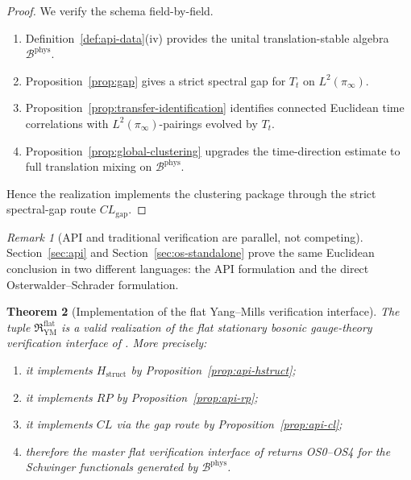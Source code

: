 \documentclass[11pt]{article}
\newtheorem{theorem}{Theorem}[section]
\theoremstyle{definition}
\theoremstyle{remark}
\newtheorem{remark}[theorem]{Remark}
\newcommand{\mcB}{\mathcal B}
\begin{document}
\begin{proof}
We verify the schema field-by-field.
\begin{enumerate}[label=\textnormal{(CL\arabic*)},leftmargin=1.5em]
\item Definition~\ref{def:api-data}\textnormal{(iv)} provides the unital
translation-stable algebra \(\mcB^{\mathrm{phys}}\).
\item Proposition~\ref{prop:gap} gives a strict spectral gap for \(T_t\) on
\(L^2(\pi_\infty)\).
\item Proposition~\ref{prop:transfer-identification} identifies connected
Euclidean time correlations with \(L^2(\pi_\infty)\)-pairings evolved by
\(T_t\).
\item Proposition~\ref{prop:global-clustering} upgrades the time-direction
estimate to full translation mixing on \(\mcB^{\mathrm{phys}}\).
\end{enumerate}
Hence the realization implements the clustering package through the strict
spectral-gap route \(CL_{\mathrm{gap}}\).
\end{proof}

\begin{remark}[API and traditional verification are parallel, not competing]
Section~\ref{sec:api} and Section~\ref{sec:os-standalone} prove the same
Euclidean conclusion in two different languages: the API formulation and the
direct Osterwalder--Schrader formulation.
\end{remark}

\begin{theorem}[Implementation of the flat Yang--Mills verification interface]
\label{thm:api-euclidean}
The tuple \(\mathfrak R_{\mathrm{YM}}^{\mathrm{flat}}\) is a valid
realization of the flat stationary bosonic gauge-theory verification interface
of \cite{axioms}.  More precisely:
\begin{enumerate}[label=\textnormal{(\roman*)},leftmargin=1.5em]
\item it implements \(H_{\mathrm{struct}}\) by
Proposition~\ref{prop:api-hstruct};
\item it implements \(RP\) by Proposition~\ref{prop:api-rp};
\item it implements \(CL\) via the gap route by
Proposition~\ref{prop:api-cl};
\item therefore the master flat verification interface of \cite{axioms}
returns OS0--OS4 for the Schwinger functionals generated by
\(\mcB^{\mathrm{phys}}\).
\end{enumerate}
\end{theorem}
\end{document}
